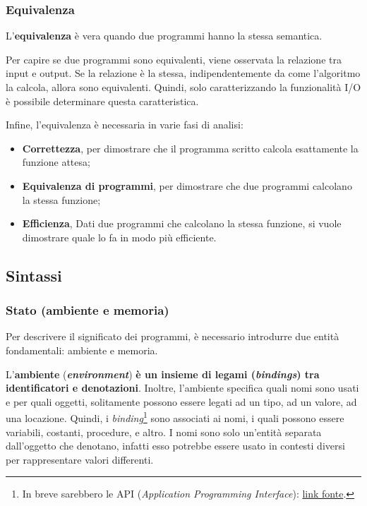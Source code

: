\documentclass[a4paper]{article}
\begin{document}
	\subsubsection{Equivalenza}
	
	L'\textcolor{Red3}{\textbf{equivalenza}} è vera quando due programmi hanno la stessa semantica.\newline
	
	\noindent
	Per capire se due programmi sono equivalenti, viene osservata la relazione tra input e output. Se la relazione è la stessa, indipendentemente da come l'algoritmo la calcola, allora sono equivalenti. Quindi, solo caratterizzando la funzionalità I/O è possibile determinare questa caratteristica.\newline
	
	\noindent
	Infine, l'equivalenza è necessaria in varie fasi di analisi:
	\begin{itemize}
		\item \textbf{Correttezza}, per dimostrare che il programma scritto calcola esattamente la funzione attesa;
		
		\item \textbf{Equivalenza di programmi}, per dimostrare che due programmi calcolano la stessa funzione;
		
		\item \textbf{Efficienza}, Dati due programmi che calcolano la stessa funzione, si vuole dimostrare quale lo fa in modo più efficiente.
	\end{itemize}\newpage
	
	\subsection{Sintassi}
	
	\subsubsection{Stato (ambiente e memoria)}
	
	Per descrivere il significato dei programmi, è necessario introdurre due entità fondamentali: ambiente e memoria.\newline
	
	\noindent
	L'\textcolor{Red3}{\textbf{ambiente}} (\textbf{\emph{environment}}) \textbf{è un insieme di legami (\emph{bindings}) tra identificatori e denotazioni}. Inoltre, l'ambiente specifica quali nomi sono usati e per quali oggetti, solitamente possono essere legati ad un tipo, ad un valore, ad una locazione. Quindi, i \emph{binding}\footnote{In breve sarebbero le API (\emph{Application Programming Interface}): \href{https://en.wikipedia.org/wiki/Language_binding}{link fonte}.} sono associati ai nomi, i quali possono essere variabili, costanti, procedure, e altro. I nomi sono solo un'entità separata dall'oggetto che denotano, infatti esso potrebbe essere usato in contesti diversi per rappresentare valori differenti.\newline
	
\end{document}
